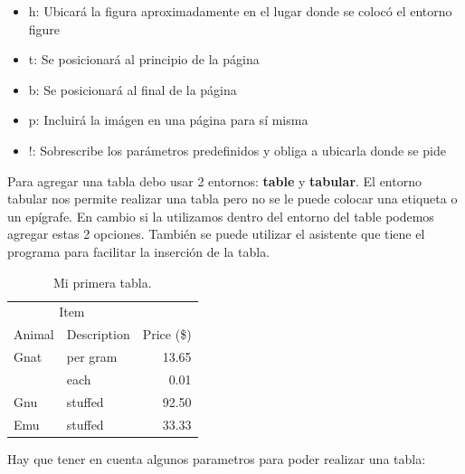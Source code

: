\documentclass[a4paper,11pt,twoside]{article}
\begin{document}
\begin{itemize}
\item{h: Ubicará la figura aproximadamente en el lugar donde se colocó el entorno figure}
\item{t: Se posicionará al principio de la página}
\item{b: Se posicionará al final de la página}
\item{p: Incluirá la imágen en una página para sí misma}
\item{!: Sobrescribe los parámetros predefinidos y obliga a ubicarla donde se pide}
\end{itemize}

Para agregar una tabla debo usar 2 entornos: \textbf{table} y \textbf{tabular}. El entorno tabular nos permite realizar una tabla pero no se le puede colocar una etiqueta o un epígrafe. En cambio si la utilizamos dentro del entorno del table podemos agregar estas 2 opciones. También se puede utilizar el asistente que tiene el programa para facilitar la inserción de la tabla.

\begin{table}[h] %
 \centering %
 \begin{tabular}{ll|r} %
  \hline
  \multicolumn{2}{c|}{Item} \\
  \cline{1-2}
  Animal    & Description & Price (\$) \\
  \hline
  Gnat      & per gram    & 13.65      \\
            & each        & 0.01       \\
  Gnu       & stuffed     & 92.50      \\
  Emu       & stuffed     & 33.33      \\
  \hline
 \end{tabular}
 \caption{Mi primera tabla.}
 \label{tab:tabla1}
\end{table}
Hay que tener en cuenta algunos parametros para poder realizar una tabla:
\end{document}
